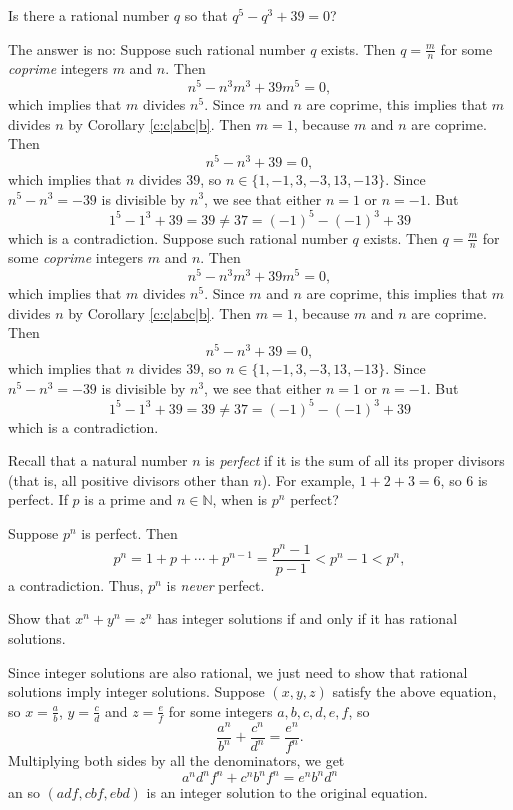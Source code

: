 \documentclass[11pt,dvipsnames]{book}
\numberwithin{equation}{section} %
\numberwithin{figure}{section} %
\numberwithin{table}{section} %
\begin{document}
\begin{exercise} Is there a rational number $q$ so that $q^{5}-q^{3}+39=0$?

\begin{solution}
 The answer is no: Suppose such rational number $q$ exists. Then $q=\frac{m}{n}$ for some {\it coprime} integers $m$ and $n$. Then
\[
n^5-n^3m^3 + 39m^5 = 0,\]
which implies that $m$ divides $n^5$. Since $m$ and $n$ are coprime, this implies
that $m$ divides $n$ by Corollary \ref{c:c|abc|b}. Then $m = 1$, because $m$ and $n$ are coprime. Then
\[
n^5-n^3+39=0,
\]
which implies that $n$ divides $ 39$, so $n\in \{1,-1, 3,-3, 13,-13\}$. Since
$n^5-n^3 =-39$  is divisible by $n^3$, we see that either $n=1$ or $n=-1$. But
\[1^{5}-1^3+39=39\neq 37 = (-1)^{5}-(-1)^{3}+39\]
which is a contradiction. Suppose such rational number $q$ exists. Then $q=\frac{m}{n}$ for some {\it coprime} integers $m$ and $n$. Then
\[
n^5-n^3m^3 + 39m^5 = 0,\]
which implies that $m$ divides $n^5$. Since $m$ and $n$ are coprime, this implies
that $m$ divides $n$ by Corollary \ref{c:c|abc|b}. Then $m=1$, because $m$ and $n$ are coprime. Then
\[
n^5-n^3 +39=0,
\]
which implies that $n$ divides $ 39$, so $n\in \{1, -1, 3, -3, 13, -13\}$. Since
$n^5-n^3 =-39$  is divisible by $n^3$, we see that either $n=1$ or $n=-1$. But
\[1^{5}-1^3+39=39\neq 37 = (-1)^{5}-(-1)^{3}+39\]
which is a contradiction.
\end{solution}

\end{exercise}


\begin{exercise} Recall that a natural number $n$ is {\it perfect} if it is the sum of all its proper divisors (that is, all positive divisors other than $n$). For example, $1 + 2 + 3 = 6$, so $6$ is perfect. If $p$ is a prime and $n\in\mathbb{N}$, when is $p^{n}$ perfect? 

\begin{solution}
Suppose $p^{n}$ is perfect. Then
\[
p^{n} = 1+p+\cdots + p^{n-1} = \frac{p^{n}-1}{p-1}<p^{n}-1<p^{n},
\]
a contradiction. Thus, $p^{n}$ is {\it never} perfect.
\end{solution}

\end{exercise}


\begin{exercise} Show that $x^{n}+y^{n}=z^{n}$ has integer solutions if and only if it has rational solutions. 
\begin{solution}
Since integer solutions are also rational, we just need to show that rational solutions imply integer solutions. Suppose $(x,y,z)$ satisfy the above equation, so $x=\frac{a}{b}$, $y=\frac{c}{d}$ and $z=\frac{e}{f}$ for some integers $a,b,c,d,e,f$, so 
\[
\frac{a^n}{b^n} + \frac{c^n}{d^n}=\frac{e^{n}}{f^{n}}.
\]
Multiplying both sides by all the denominators, we get
\[
a^{n}d^{n}f^{n} + c^{n}b^{n}f^{n} = e^{n} b^{n}d^{n}
\]
an so $(adf,cbf,ebd)$ is an integer solution to the original equation.
\end{solution}
\end{exercise}
\end{document}
